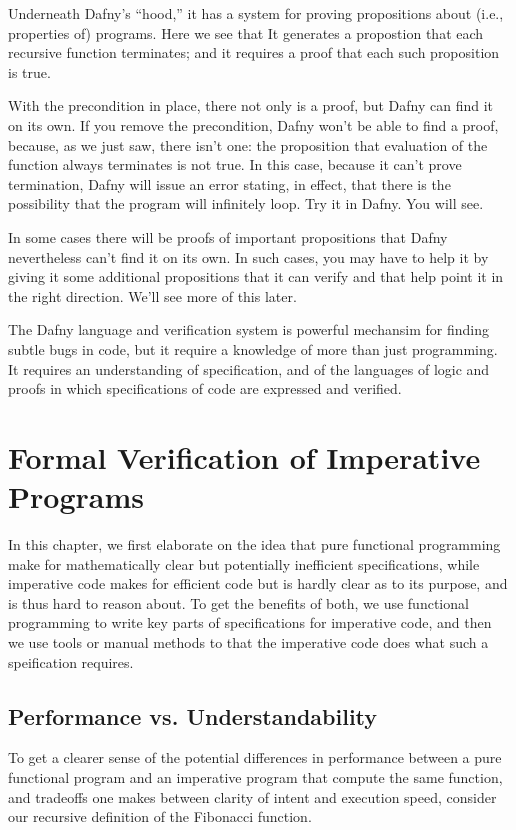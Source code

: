 \documentclass[letterpaper,10pt,english]{sphinxmanual}
\begin{document}
Underneath Dafny’s “hood,” it has a system for proving propositions
about (i.e., properties of) programs. Here we see that It generates a
propostion that each recursive function terminates; and it requires a
proof that each such proposition is true.

With the precondition in place, there not only is a proof, but Dafny
can find it on its own. If you remove the precondition, Dafny won’t be
able to find a proof, because, as we just saw, there isn’t one: the
proposition that evaluation of the function always terminates is not
true. In this case, because it can’t prove termination, Dafny will
issue an error stating, in effect, that there is the possibility that
the program will infinitely loop. Try it in Dafny.  You will see.

In some cases there will be proofs of important propositions that
Dafny nevertheless can’t find it on its own. In such cases, you may
have to help it by giving it some additional propositions that it
can verify and that help point it in the right direction. We’ll see
more of this later.

The Dafny language and verification system is powerful mechansim for
finding subtle bugs in code, but it require a knowledge of more than
just programming. It requires an understanding of specification, and
of the languages of logic and proofs in which specifications of code
are expressed and verified.


\chapter{Formal Verification of Imperative Programs}
\label{\detokenize{05-verifying-logical-specifications:formal-verification-of-imperative-programs}}\label{\detokenize{05-verifying-logical-specifications::doc}}
In this chapter, we first elaborate on the idea that pure functional
programming make for mathematically clear but potentially inefficient
specifications, while imperative code makes for efficient code but is
hardly clear as to its purpose, and is thus hard to reason about. To
get the benefits of both, we use functional programming to write key
parts of specifications for imperative code, and then we use tools or
manual methods to  that the imperative code does what such a
speification requires.


\section{Performance vs. Understandability}
\label{\detokenize{05-verifying-logical-specifications:performance-vs-understandability}}
To get a clearer sense of the potential differences in performance
between a pure functional program and an imperative program that
compute the same function, and tradeoffs one makes between clarity of
intent and execution speed, consider our recursive definition of the
Fibonacci function.
\end{document}
